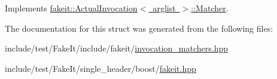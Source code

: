 Implements \mbox{\hyperlink{structfakeit_1_1ActualInvocation_1_1Matcher_a7459c74697253717984b5e86c9e30ae6}{fakeit\+::\+Actual\+Invocation$<$ arglist $>$\+::\+Matcher}}.



The documentation for this struct was generated from the following files\+:\begin{DoxyCompactItemize}
\item 
include/test/\+Fake\+It/include/fakeit/\mbox{\hyperlink{invocation__matchers_8hpp}{invocation\+\_\+matchers.\+hpp}}\item 
include/test/\+Fake\+It/single\+\_\+header/boost/\mbox{\hyperlink{single__header_2boost_2fakeit_8hpp}{fakeit.\+hpp}}\end{DoxyCompactItemize}
